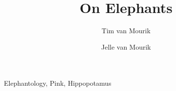 \documentclass[preprint,authoryear]{elsarticle}
\numberwithin{equation}{section}
\numberwithin{figure}{section}
\begin{document}

\begin{frontmatter}
\title{On Elephants}

\author[DccnAddres]{Tim van Mourik}
\author[YorkAddress,SonyAddress]{Jelle van Mourik}

\address[DccnAddres]{Donders Institute for Brain, Cognition and Behaviour, Radboud University Nijmegen, 6525 EN Nijmegen, The Netherlands}
\address[YorkAddress]{The Department of Electronics, The University of York, Heslington, York, North Yorkshire, YO10 5DD}
\address[SonyAddress]{Sony Computer Entertainment Europe, 10-15 Great Marlborough St, London W1F 7HR, United Kingdom}

\begin{keyword}

Elephantology, Pink, Hippopotamus
\end{keyword}
\end{frontmatter}

\newpage

\savethetrees

\savethetrees

\savethetrees

\savethetrees

\savethetrees

\savethetrees


\onecolumn

%
\end{document}
